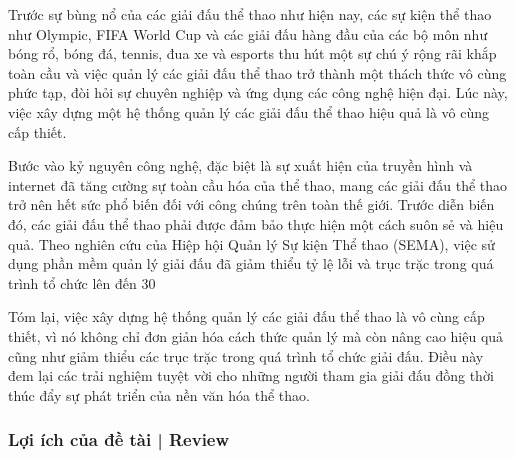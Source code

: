 Trước sự bùng nổ của các giải đấu thể thao như hiện nay, các sự kiện thể thao như Olympic, FIFA World Cup và các giải đấu hàng đầu của các bộ môn như bóng rổ, bóng đá, tennis, đua xe và esports thu hút một sự chú ý rộng rãi khắp toàn cầu và việc quản lý các giải đấu thể thao trở thành một thách thức vô cùng phức tạp, đòi hỏi sự chuyên nghiệp và ứng dụng các công nghệ hiện đại. Lúc này, việc xây dựng một hệ thống quản lý các giải đấu thể thao hiệu quả là vô cùng cấp thiết.
\par
Bước vào kỷ nguyên công nghệ, đặc biệt là sự xuất hiện của truyền hình và internet đã tăng cường sự toàn cầu hóa của thể thao, mang các giải đấu thể thao trở nên hết sức phổ biến đối với công chúng trên toàn thế giới. Trước diễn biến đó, các giải đấu thể thao phải được đảm bảo thực hiện một cách suôn sẻ và hiệu quả. Theo nghiên cứu của Hiệp hội Quản lý Sự kiện Thể thao (SEMA), việc sử dụng phần mềm quản lý giải đấu đã giảm thiểu tỷ lệ lỗi và trục trặc trong quá trình tổ chức lên đến 30%
\par
Tóm lại, việc xây dựng hệ thống quản lý các giải đấu thể thao là vô cùng cấp thiết, vì nó không chỉ đơn giản hóa cách thức quản lý mà còn nâng cao hiệu quả cũng như giảm thiểu các trục trặc trong quá trình tổ chức giải đấu. Điều này đem lại các trải nghiệm tuyệt vời cho những người tham gia giải đấu đồng thời thúc đẩy sự phát triển của nền văn hóa thể thao.


\subsubsection{Lợi ích của đề tài | Review}

